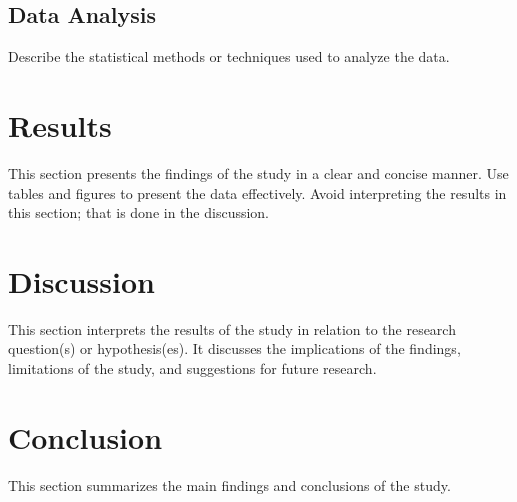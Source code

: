 \documentclass{article}
\begin{document}
\subsection{Data Analysis}
Describe the statistical methods or techniques used to analyze the data.

\section{Results}
This section presents the findings of the study in a clear and concise manner. Use tables and figures to present the data effectively.  Avoid interpreting the results in this section; that is done in the discussion.

\section{Discussion}
This section interprets the results of the study in relation to the research question(s) or hypothesis(es). It discusses the implications of the findings, limitations of the study, and suggestions for future research.

\section{Conclusion}
This section summarizes the main findings and conclusions of the study.



\end{document}
